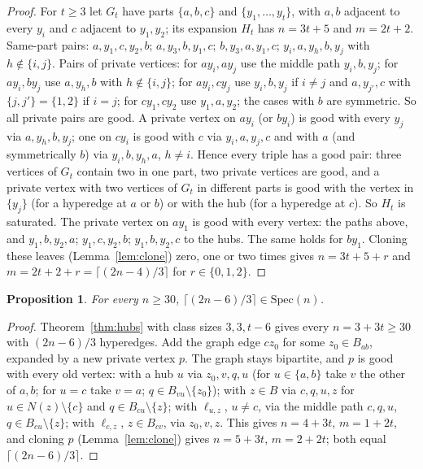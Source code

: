 \documentclass[11pt]{article}
\newtheorem{proposition}[theorem]{Proposition}
\theoremstyle{remark}
\begin{document}
\begin{proof}
For $t\ge3$ let $G_t$ have parts $\{a,b,c\}$ and $\{y_1,\dots,y_t\}$, with
$a,b$ adjacent to every $y_i$ and $c$ adjacent to $y_1,y_2$; its expansion
$H_t$ has $n=3t+5$ and $m=2t+2$. Same-part pairs: $a,y_1,c,y_2,b$;
$a,y_3,b,y_1,c$; $b,y_3,a,y_1,c$; $y_i,a,y_h,b,y_j$ with $h\notin\{i,j\}$.
Pairs of private vertices: for $ay_i,ay_j$ use the middle path $y_i,b,y_j$;
for $ay_i,by_j$ use $a,y_h,b$ with $h\notin\{i,j\}$; for $ay_i,cy_j$ use
$y_i,b,y_j$ if $i\ne j$ and $a,y_{j'},c$ with $\{j,j'\}=\{1,2\}$ if $i=j$;
for $cy_1,cy_2$ use $y_1,a,y_2$; the cases with $b$ are symmetric. So all
private pairs are good. A private vertex on $ay_i$ (or $by_i$) is good
with every $y_j$ via $a,y_h,b,y_j$; one on $cy_i$ is good with $c$ via
$y_i,a,y_j,c$ and with $a$ (and symmetrically $b$) via $y_i,b,y_h,a$,
$h\ne i$. Hence every triple has a good pair: three vertices of $G_t$
contain two in one part, two private vertices are good, and a private
vertex with two vertices of $G_t$ in different parts is good with the
vertex in $\{y_j\}$ (for a hyperedge at $a$ or $b$) or with the hub (for a
hyperedge at $c$). So $H_t$ is saturated. The
private vertex on $ay_1$ is good with every vertex: the paths above, and
$y_1,b,y_2,a$; $y_1,c,y_2,b$; $y_1,b,y_2,c$ to the hubs. The same holds for
$by_1$. Cloning these leaves (Lemma~\ref{lem:clone}) zero, one or two times
gives $n=3t+5+r$ and $m=2t+2+r=\lceil(2n-4)/3\rceil$ for $r\in\{0,1,2\}$.
\end{proof}

\begin{proposition}\label{prop:three}
For every $n\ge30$, $\lceil(2n-6)/3\rceil\in\mathrm{Spec}(n)$.
\end{proposition}

\begin{proof}
Theorem~\ref{thm:hubs} with class sizes $3,3,t-6$ gives every $n=3+3t\ge30$
with $(2n-6)/3$ hyperedges. Add the graph edge $cz_0$ for some $z_0\in B_{ab}$,
expanded by a new private vertex $p$. The graph stays bipartite, and $p$
is good with every old vertex: with a hub $u$ via $z_0,v,q,u$ (for
$u\in\{a,b\}$ take $v$ the other of $a,b$; for $u=c$ take $v=a$;
$q\in B_{vu}\setminus\{z_0\}$); with $z\in B$ via $c,q,u,z$ for $u\in
N(z)\setminus\{c\}$ and $q\in B_{cu}\setminus\{z\}$; with $\ell_{u,z}$, $u\ne c$,
via the middle path $c,q,u$, $q\in B_{cu}\setminus\{z\}$; with $\ell_{c,z}$,
$z\in B_{cv}$, via $z_0,v,z$. This gives $n=4+3t$, $m=1+2t$, and cloning $p$
(Lemma~\ref{lem:clone}) gives $n=5+3t$, $m=2+2t$; both equal
$\lceil(2n-6)/3\rceil$.
\end{proof}
\end{document}
